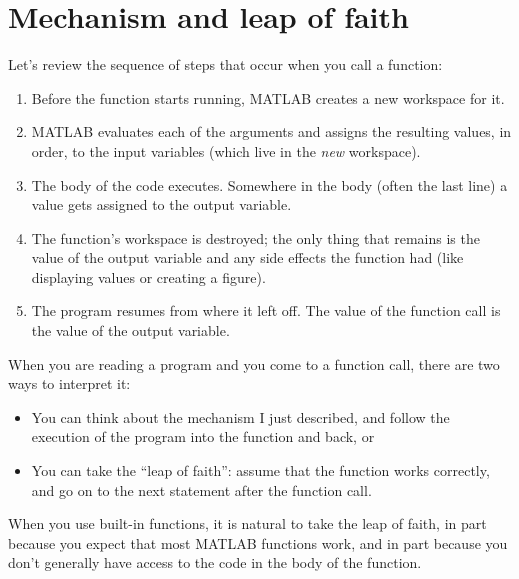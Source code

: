 \documentclass{book}
\begin{document}
\section{Mechanism and leap of faith}

Let's review the sequence of steps that occur when you call
a function:

\begin{enumerate}

\item Before the function starts running, MATLAB creates a new
workspace for it.

\item MATLAB evaluates each of the arguments and assigns
the resulting values, in order, to the input variables (which
live in the {\em new} workspace).

\item The body of the code executes.  Somewhere in the body
(often the last line) a value gets assigned to the output variable.

\item The function's workspace is destroyed; the only thing
that remains is the value of the output variable and any side
effects the function had (like displaying values or creating
a figure).

\item The program resumes from where it left off.  The value
of the function call is the value of the output variable.

\end{enumerate}

When you are reading a program and you come to a function call,
there are two ways to interpret it:

\begin{itemize}

\item You can think about the mechanism I just described,
and follow the execution of the program into the function and back, or

\item You can take the ``leap of faith'': assume that the function
works correctly, and go on to the next statement after the
function call.

\end{itemize}

When you use built-in functions, it is natural to take the leap
of faith, in part because you expect that most
MATLAB functions work, and in part because you don't
generally have access to the code in the body of the function.
\end{document}
